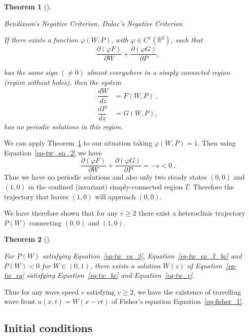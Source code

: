 \documentclass[
  letterpaper,
  DIV=11,
  numbers=noendperiod]{scrreprt}
\theoremstyle{definition}
\theoremstyle{plain}
\newtheorem{theorem}{Theorem}[chapter]
\theoremstyle{plain}
\theoremstyle{remark}
\begin{document}
\begin{theorem}[]\protect\hypertarget{thm-bendixson}{}\label{thm-bendixson}

Bendixson's Negative Criterion, Dulac's Negative Criterion

If there exists a function \(\varphi(W,P)\), with
\(\varphi \in C^1(\mathbb R^2)\), such that \[
 \frac{\partial(\varphi F )}{\partial W} +  \frac{\partial(\varphi G )}{\partial P},
\]

has the same sign \((\neq 0)\) almost everywhere in a simply connected
region (region without holes), then the system \[
 \begin{aligned}
 \dfrac{ dW}{dz} &= F(W,P) \; , 
 \\   \dfrac{dP}{dz} &= G(W,P),
\end{aligned}
\] has no periodic solutions in this region.

\end{theorem}

We can apply Theorem~\ref{thm-bendixson} to our situation taking
\(\varphi(W,P) = 1\). Then using Equation~\ref{eq-tw_eq_2} we have \[
 \frac{\partial(\varphi F )}{\partial W} +  \frac{\partial(\varphi G )}{\partial P} = - v < 0\; .
\] Thus we have no periodic solutions and also only two steady states
\((0,0)\) and \((1,0)\) in the confined (invariant) simply-connected
region \(T\). Therefore the trajectory that leaves \((1,0)\) will
approach \((0,0)\).

We have therefore shown that for any \(v\geq 2\) there exist a
heteroclinic trajectory \(P(W)\) connecting \((0,0)\) and \((1,0)\).

\begin{theorem}[]\protect\hypertarget{thm-trwaveexistence}{}\label{thm-trwaveexistence}

For \(P(W)\) satisfying Equation~\ref{eq-tw_eq_3},
Equation~\ref{eq-tw_eq_3_bc} and \(P(W) < 0\) for \(W \in (0,1)\), there
exists a solution \(W(z)\) of Equation~\ref{eq-tw_eq} satisfying
Equation~\ref{eq-tw_bc} and Equation~\ref{eq-tw_r}.

\end{theorem}

Thus for any wave speed \(v\) satisfying \(v \geq 2\), we have the
existence of travelling wave front \(u(x,t)= W(x- vt)\) of Fisher's
equation Equation~\ref{eq-fisher_1}.

\hypertarget{initial-conditions-1}{%
\subsection{Initial conditions}\label{initial-conditions-1}}
\end{document}
